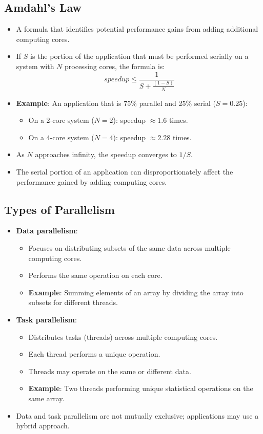 \subsection{Amdahl's Law}
\begin{itemize}
    \item A formula that identifies potential performance gains from adding additional computing cores.
    \item If $S$ is the portion of the application that must be performed serially on a system with $N$ processing cores, the formula is:
    $$speedup \le \frac{1}{{S + \frac{{\left( {1 - S} \right)}}{N}}}$$
    \item \textbf{Example}: An application that is 75\% parallel and 25\% serial ($S=0.25$):
        \begin{itemize}
            \item On a 2-core system ($N=2$): speedup $\approx 1.6$ times.
            \item On a 4-core system ($N=4$): speedup $\approx 2.28$ times.
        \end{itemize}
    \item As $N$ approaches infinity, the speedup converges to $1/S$.
    \item The serial portion of an application can disproportionately affect the performance gained by adding computing cores.
\end{itemize}

\subsection{Types of Parallelism}
\begin{itemize}
    \item \textbf{Data parallelism}:
        \begin{itemize}
            \item Focuses on distributing subsets of the same data across multiple computing cores.
            \item Performs the same operation on each core.
            \item \textbf{Example}: Summing elements of an array by dividing the array into subsets for different threads.
        \end{itemize}
    \item \textbf{Task parallelism}:
        \begin{itemize}
            \item Distributes tasks (threads) across multiple computing cores.
            \item Each thread performs a unique operation.
            \item Threads may operate on the same or different data.
            \item \textbf{Example}: Two threads performing unique statistical operations on the same array.
        \end{itemize}
    \item Data and task parallelism are not mutually exclusive; applications may use a hybrid approach.
\end{itemize}

